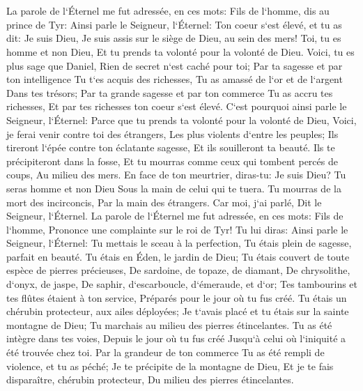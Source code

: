 \chapter{}

\verse La parole de l`Éternel me fut adressée, en ces mots: 
\verse Fils de l`homme, dis au prince de Tyr: Ainsi parle le Seigneur, l`Éternel: Ton coeur s`est élevé, et tu as dit: Je suis Dieu, Je suis assis sur le siège de Dieu, au sein des mers! Toi, tu es homme et non Dieu, Et tu prends ta volonté pour la volonté de Dieu. 
\verse Voici, tu es plus sage que Daniel, Rien de secret n`est caché pour toi; 
\verse Par ta sagesse et par ton intelligence Tu t`es acquis des richesses, Tu as amassé de l`or et de l`argent Dans tes trésors; 
\verse Par ta grande sagesse et par ton commerce Tu as accru tes richesses, Et par tes richesses ton coeur s`est élevé. 
\verse C`est pourquoi ainsi parle le Seigneur, l`Éternel: Parce que tu prends ta volonté pour la volonté de Dieu, 
\verse Voici, je ferai venir contre toi des étrangers, Les plus violents d`entre les peuples; Ils tireront l`épée contre ton éclatante sagesse, Et ils souilleront ta beauté. 
\verse Ils te précipiteront dans la fosse, Et tu mourras comme ceux qui tombent percés de coups, Au milieu des mers. 
\verse En face de ton meurtrier, diras-tu: Je suis Dieu? Tu seras homme et non Dieu Sous la main de celui qui te tuera. 
\verse Tu mourras de la mort des incirconcis, Par la main des étrangers. Car moi, j`ai parlé, Dit le Seigneur, l`Éternel. 
\verse La parole de l`Éternel me fut adressée, en ces mots: 
\verse Fils de l`homme, Prononce une complainte sur le roi de Tyr! Tu lui diras: Ainsi parle le Seigneur, l`Éternel: Tu mettais le sceau à la perfection, Tu étais plein de sagesse, parfait en beauté. 
\verse Tu étais en Éden, le jardin de Dieu; Tu étais couvert de toute espèce de pierres précieuses, De sardoine, de topaze, de diamant, De chrysolithe, d`onyx, de jaspe, De saphir, d`escarboucle, d`émeraude, et d`or; Tes tambourins et tes flûtes étaient à ton service, Préparés pour le jour où tu fus créé. 
\verse Tu étais un chérubin protecteur, aux ailes déployées; Je t`avais placé et tu étais sur la sainte montagne de Dieu; Tu marchais au milieu des pierres étincelantes. 
\verse Tu as été intègre dans tes voies, Depuis le jour où tu fus créé Jusqu`à celui où l`iniquité a été trouvée chez toi. 
\verse Par la grandeur de ton commerce Tu as été rempli de violence, et tu as péché; Je te précipite de la montagne de Dieu, Et je te fais disparaître, chérubin protecteur, Du milieu des pierres étincelantes. 
